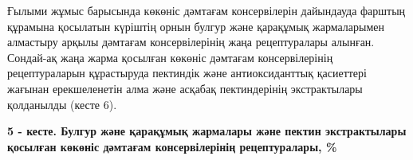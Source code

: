 Ғылыми жұмыс барысында көкөніс дәмтағам консервілерін дайындауда фарштың
құрамына қосылатын күріштің орнын булгур және қарақұмық жармаларымен
алмастыру арқылы дәмтағам консервілерінің жаңа рецептуралары алынған.
Сондай-ақ жаңа жарма қосылған көкөніс дәмтағам консервілерінің
рецептураларын құрастыруда пектиндік және антиоксиданттық қасиеттері
жағынан ерекшеленетін алма және асқабақ пектиндерінің экстрактылары
қолданылды (кесте 6).

{\bfseries 5 - кесте. Булгур және қарақұмық жармалары және пектин
экстрактылары қосылған көкөніс дәмтағам консервілерінің рецептуралары,
\%}

